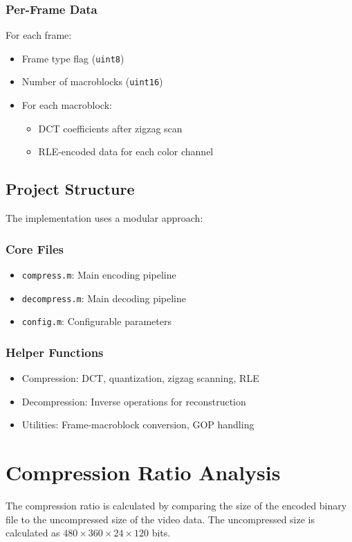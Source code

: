 \documentclass{article}
\begin{document}
\subsubsection{Per-Frame Data}
For each frame:
\begin{itemize}
    \item Frame type flag (\texttt{uint8})
    \item Number of macroblocks (\texttt{uint16})
    \item For each macroblock:
        \begin{itemize}
            \item DCT coefficients after zigzag scan
            \item RLE-encoded data for each color channel
        \end{itemize}
\end{itemize}

\subsection{Project Structure}
The implementation uses a modular approach:

\subsubsection{Core Files}
\begin{itemize}
    \item \texttt{compress.m}: Main encoding pipeline
    \item \texttt{decompress.m}: Main decoding pipeline
    \item \texttt{config.m}: Configurable parameters
\end{itemize}

\subsubsection{Helper Functions}
\begin{itemize}
    \item Compression: DCT, quantization, zigzag scanning, RLE
    \item Decompression: Inverse operations for reconstruction
    \item Utilities: Frame-macroblock conversion, GOP handling
\end{itemize}

\section{Compression Ratio Analysis}
The compression ratio is calculated by comparing the size of the encoded binary file to the uncompressed size of the video data. The uncompressed size is calculated as $480 \times 360 \times 24 \times 120$ bits.
\end{document}
